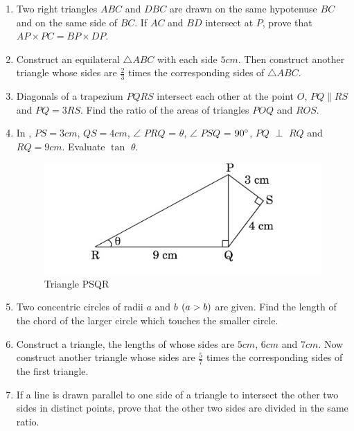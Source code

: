\begin{enumerate}
\item Two right triangles $ABC$ and $DBC$ are drawn on the same hypotenuse $BC$ and on the same side of $BC$. If $AC$ and $BD$ intersect at $P$, prove that $AP \times PC = BP \times DP$.

\item Construct an equilateral $\triangle ABC$ with each side $5 cm$. Then construct another triangle whose sides are $\frac{2}{3}$ times the corresponding sides of $\triangle ABC$.

\item Diagonals of a trapezium $PQRS$ intersect each other at the point $O$,
$PQ \parallel RS$ and $PQ = 3RS$. Find the ratio of the areas of triangles $POQ$ and $ROS$.

\item In , $PS = 3 cm$, $QS = 4 cm$, $\angle$ $PRQ$ = $\theta$, $\angle$ $PSQ$ = $90\degree$, $PQ$ $\perp$ $RQ$ and $RQ = 9 cm$. Evaluate $\tan$ $\theta$.
\begin{figure}[H]
    \centering
    \includegraphics[width=\columnwidth]{figs/Screenshot2023-12-27094821.png}
     \caption{Triangle PSQR}
    \label{fig:Fig-1}
\end{figure}

\item Two concentric circles of radii $a$ and $b$ $\left(a > b\right)$ are given. Find the length of the chord of the larger circle which touches the smaller circle.

\item Construct a triangle, the lengths of whose sides are $5 cm$, $6 cm$ and $7 cm$. Now construct another triangle whose sides are $\frac{5}{7}$ times the corresponding sides of the first triangle.

\item If a line is drawn parallel to one side of a triangle to intersect the other two sides in distinct points, prove that the other two sides are divided in the same ratio.


\end{enumerate}

